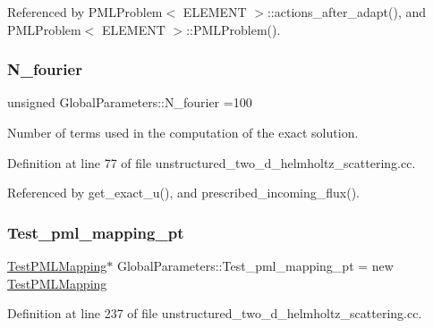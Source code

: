 Referenced by P\+M\+L\+Problem$<$ E\+L\+E\+M\+E\+N\+T $>$\+::actions\+\_\+after\+\_\+adapt(), and P\+M\+L\+Problem$<$ E\+L\+E\+M\+E\+N\+T $>$\+::\+P\+M\+L\+Problem().

\mbox{\label{namespaceGlobalParameters_ae4df03bf0ffa55b741ac846ca7b6c155}} 
\subsubsection{\texorpdfstring{N\+\_\+fourier}{N\_fourier}}
{\footnotesize\ttfamily unsigned Global\+Parameters\+::\+N\+\_\+fourier =100}



Number of terms used in the computation of the exact solution. 



Definition at line 77 of file unstructured\+\_\+two\+\_\+d\+\_\+helmholtz\+\_\+scattering.\+cc.



Referenced by get\+\_\+exact\+\_\+u(), and prescribed\+\_\+incoming\+\_\+flux().

\mbox{\label{namespaceGlobalParameters_a66c84b0ba0a324423154d08c56051d0b}} 
\subsubsection{\texorpdfstring{Test\+\_\+pml\+\_\+mapping\+\_\+pt}{Test\_pml\_mapping\_pt}}
{\footnotesize\ttfamily \hyperlink{classGlobalParameters_1_1TestPMLMapping}{Test\+P\+M\+L\+Mapping}$\ast$ Global\+Parameters\+::\+Test\+\_\+pml\+\_\+mapping\+\_\+pt = new \hyperlink{classGlobalParameters_1_1TestPMLMapping}{Test\+P\+M\+L\+Mapping}}



Definition at line 237 of file unstructured\+\_\+two\+\_\+d\+\_\+helmholtz\+\_\+scattering.\+cc.

\mbox{\label{namespaceGlobalParameters_a571b847702904d4cf646ac7ff17a7d2c}} 
